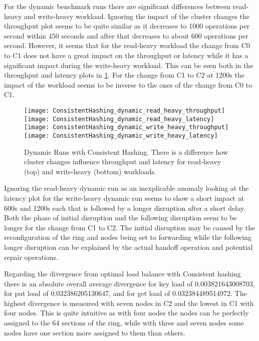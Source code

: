 For the dynamic benchmark runs there are significant differences between read-heavy and write-heavy workload.
Ignoring the impact of the cluster changes the throughput plot seems to be quite similar as it decreases to 1000 operations per second within 450 seconds and after that decreases to about 600 operations per second.
However, it seems that for the read-heavy workload the change from C0 to C1 does not have a great impact on the throughput or latency while it has a significant impact during the write-heavy workload.
This can be seen both in the throughput and latency plots in \cref{fig:consistent_hashing_dynamic}.
For the change from C1 to C2 at 1200s the impact of the workload seems to be inverse to the ones of the change from C0 to C1.
\begin{figure}
\texttt{[image: ConsistentHashing\_dynamic\_read\_heavy\_throughput]}
\texttt{[image: ConsistentHashing\_dynamic\_read\_heavy\_latency]}
\texttt{[image: ConsistentHashing\_dynamic\_write\_heavy\_throughput]}
\texttt{[image: ConsistentHashing\_dynamic\_write\_heavy\_latency]}
\caption[Dynamic Runs with Consistent Hashing]{Dynamic Runs with Consistent Hashing. There is a difference how cluster changes influence throughput and latency for read-heavy (top) and write-heavy (bottom) workloads.}
\label{fig:consistent_hashing_dynamic}
\end{figure}
Ignoring the read-heavy dynamic run as an inexplicable anomaly looking at the latency plot for the write-heavy dynamic run seems to show a short impact at 600s and 1200s each that is followed by a longer disruption after a short delay.
Both the phase of initial disruption and the following disruption seem to be longer for the change from C1 to C2.
The initial disruption may be caused by the reconfiguration of the ring and nodes being set to forwarding while the following longer disruption can be explained by the actual handoff operation and potential repair operations.

Regarding the divergence from optimal load balance with Consistent hashing there is an absolute overall average divergence for key load of 0.003821643008703, for put load of 0.032386205130647, and for get load of 0.032384489514972.
The highest divergence is measured with seven nodes in C2 and the lowest in C1 with four nodes.
This is quite intuitive as with four nodes the nodes can be perfectly assigned to the 64 sections of the ring, while with three and seven nodes some nodes have one section more assigned to them than others. 

